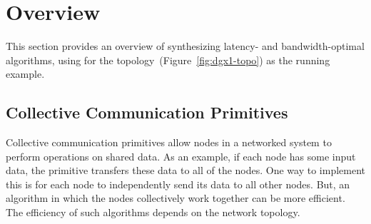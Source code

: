 \section{Overview}
This section provides an overview of synthesizing latency- and bandwidth-optimal algorithms, using \allgather for the 
\dgxone topology~(Figure~\ref{fig:dgx1-topo}) as the running example. 

\subsection{Collective Communication Primitives}
\label{sec:background-collectives}
Collective communication primitives allow nodes in a networked system to perform operations on shared data. As an example, if each node has some input data, the \allgather primitive transfers these data to all of the nodes.  One way to implement this is for each node to independently send its data to all other nodes. But, an algorithm in which the nodes collectively work together can be more efficient. The efficiency of such algorithms depends on the network topology. 

